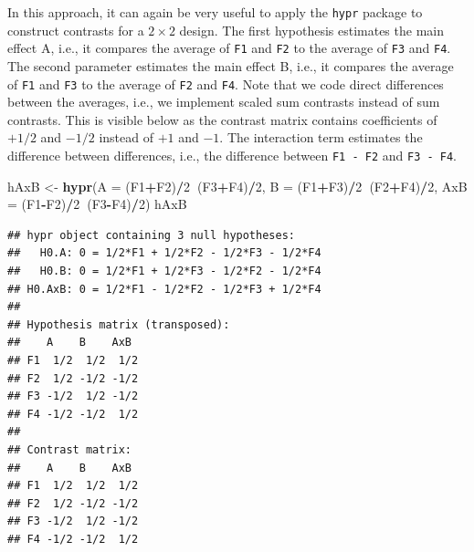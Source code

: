\documentclass[12pt,]{krantz}
\newenvironment{Shaded}{\begin{snugshade}}{\end{snugshade}}
\newcommand{\DataTypeTok}[1]{\textcolor[rgb]{0.13,0.29,0.53}{#1}}
\newcommand{\DecValTok}[1]{\textcolor[rgb]{0.00,0.00,0.81}{#1}}
\newcommand{\KeywordTok}[1]{\textcolor[rgb]{0.13,0.29,0.53}{\textbf{#1}}}
\newcommand{\NormalTok}[1]{#1}
\newcommand{\OperatorTok}[1]{\textcolor[rgb]{0.81,0.36,0.00}{\textbf{#1}}}
\newcommand{\StringTok}[1]{\textcolor[rgb]{0.31,0.60,0.02}{#1}}
\theoremstyle{definition}
\theoremstyle{definition}
\theoremstyle{definition}
\theoremstyle{remark}
\begin{document}
In this approach, it can again be very useful to apply the \texttt{hypr} package to construct contrasts for a \(2 \times 2\) design. The first hypothesis estimates the main effect A, i.e., it compares the average of \texttt{F1} and \texttt{F2} to the average of \texttt{F3} and \texttt{F4}. The second parameter estimates the main effect B, i.e., it compares the average of \texttt{F1} and \texttt{F3} to the average of \texttt{F2} and \texttt{F4}. Note that we code direct differences between the averages, i.e., we implement scaled sum contrasts instead of sum contrasts. This is visible below as the contrast matrix contains coefficients of \(+1/2\) and \(-1/2\) instead of \(+1\) and \(-1\). The interaction term estimates the difference between differences, i.e., the difference between \texttt{F1\ -\ F2} and \texttt{F3\ -\ F4}.

\begin{Shaded}
\begin{Highlighting}[]
\NormalTok{hAxB <-}\StringTok{ }\KeywordTok{hypr}\NormalTok{(}\DataTypeTok{A   =}\NormalTok{ (F1}\OperatorTok{+}\NormalTok{F2)}\OperatorTok{/}\DecValTok{2}\OperatorTok{~}\NormalTok{(F3}\OperatorTok{+}\NormalTok{F4)}\OperatorTok{/}\DecValTok{2}\NormalTok{,}
             \DataTypeTok{B   =}\NormalTok{ (F1}\OperatorTok{+}\NormalTok{F3)}\OperatorTok{/}\DecValTok{2}\OperatorTok{~}\NormalTok{(F2}\OperatorTok{+}\NormalTok{F4)}\OperatorTok{/}\DecValTok{2}\NormalTok{,}
             \DataTypeTok{AxB =}\NormalTok{ (F1}\OperatorTok{-}\NormalTok{F2)}\OperatorTok{/}\DecValTok{2}\OperatorTok{~}\NormalTok{(F3}\OperatorTok{-}\NormalTok{F4)}\OperatorTok{/}\DecValTok{2}\NormalTok{)}
\NormalTok{hAxB}
\end{Highlighting}
\end{Shaded}

\begin{verbatim}
## hypr object containing 3 null hypotheses:
##   H0.A: 0 = 1/2*F1 + 1/2*F2 - 1/2*F3 - 1/2*F4
##   H0.B: 0 = 1/2*F1 + 1/2*F3 - 1/2*F2 - 1/2*F4
## H0.AxB: 0 = 1/2*F1 - 1/2*F2 - 1/2*F3 + 1/2*F4
## 
## Hypothesis matrix (transposed):
##    A    B    AxB 
## F1  1/2  1/2  1/2
## F2  1/2 -1/2 -1/2
## F3 -1/2  1/2 -1/2
## F4 -1/2 -1/2  1/2
## 
## Contrast matrix:
##    A    B    AxB 
## F1  1/2  1/2  1/2
## F2  1/2 -1/2 -1/2
## F3 -1/2  1/2 -1/2
## F4 -1/2 -1/2  1/2
\end{verbatim}
\end{document}

